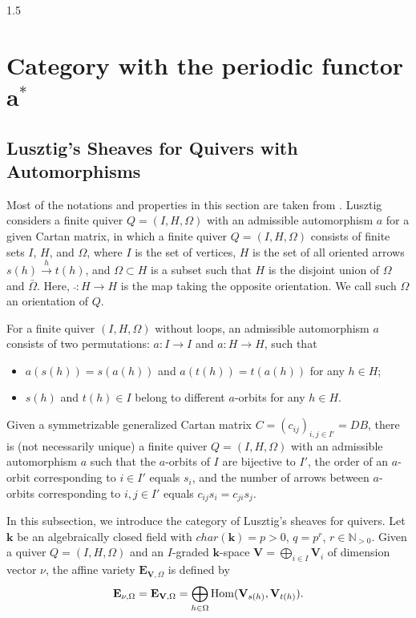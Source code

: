 \documentclass[10pt]{amsart}
\def\Hom{\mbox{\rm Hom}}  \def\ap{\mbox{\rm ap}}
\def\bfE{\mathbf{E}}
\begin{document}
\begin{spacing}{1.5}
\section{Category with the periodic functor $\mathbf{a}^*$}
\subsection{Lusztig's Sheaves for Quivers with Automorphisms}

Most of the notations and properties in this section are taken from \cite[Chapters 11, 12, and 14]{lusztig2010introduction}. Lusztig considers a finite quiver $Q = (I, H, \Omega)$ with an admissible automorphism $a$ for a given Cartan matrix, in which a finite quiver $Q = (I, H, \Omega)$ consists of finite sets $I$, $H$, and $\Omega$, where $I$ is the set of vertices, $H$ is the set of all oriented arrows $s(h) \xrightarrow{h} t(h)$, and $\Omega \subset H$ is a subset such that $H$ is the disjoint union of $\Omega$ and $\bar{\Omega}$. Here, $\bar{}: H \to H$ is the map taking the opposite orientation. We call such $\Omega$ an orientation of $Q$.

For a finite quiver $(I, H, \Omega)$ without loops, an admissible automorphism $a$ consists of two permutations: $a: I \to I$ and $a: H \to H$, such that
\begin{itemize}
    \item[(a)] $a(s(h)) = s(a(h))$ and $a(t(h)) = t(a(h))$ for any $h \in H$;
    \item[(b)] $s(h)$ and $t(h) \in I$ belong to different $a$-orbits for any $h \in H$.
\end{itemize}

Given a symmetrizable generalized Cartan matrix $C = (c_{ij})_{i,j \in I'} = DB$, there is (not necessarily unique) a finite quiver $Q = (I, H, \Omega)$ with an admissible automorphism $a$ such that the $a$-orbits of $I$ are bijective to $I'$, the order of an $a$-orbit corresponding to $i \in I'$ equals $s_i$, and the number of arrows between $a$-orbits corresponding to $i, j \in I'$ equals $c_{ij}s_i = c_{ji}s_j$.

In this subsection, we introduce the category of Lusztig's sheaves for quivers. Let $\mathbf{k}$ be an algebraically closed field with $char(\mathbf{k}) = p > 0$, $q=p^r$, $r\in \mathbb{N}_{>0}$. Given a quiver $Q = (I, H, \Omega)$ and an $I$-graded $\mathbf{k}$-space $\mathbf{V} = \bigoplus_{i \in I} \mathbf{V}_i$ of dimension vector $\nu$, the affine variety $\mathbf{E}_{\mathbf{V}, \Omega}$ is defined by
$$
\bfE_{\nu, \Omega}=\mathbf{E}_{\mathbf{V}, \Omega} = \bigoplus_{h \in \Omega} \Hom(\mathbf{V}_{s(h)}, \mathbf{V}_{t(h)}).
$$


\end{spacing}
\end{document}
